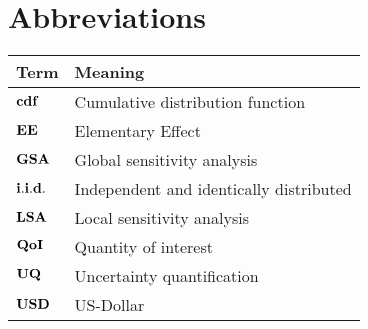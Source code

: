 

\section*{Abbreviations} %
\thispagestyle{plain} %

\phantom{This text will be invisible} 
\hspace{20cm}



\begin{table}[H]
	\centering
	\renewcommand{\arraystretch}{1.2}%
	\begin{tabular}{@{}ll@{}}
		\toprule
	Term\phantom{space}	& Meaning \\ \midrule
			$\bold{cdf}$	& Cumulative distribution function \\
		$\bold{EE}$	& Elementary Effect \\
	$\bold{GSA}$	& Global sensitivity analysis \\
	$\bold{i.i.d.}$	& Independent and identically distributed  \\
	$\bold{LSA}$	& Local sensitivity analysis \\
    $\bold{QoI}$	& Quantity of interest \\
    $\bold{UQ}$	& Uncertainty quantification \\
    $\bold{USD}$	& US-Dollar  \\
 \bottomrule
	\end{tabular}
\end{table}